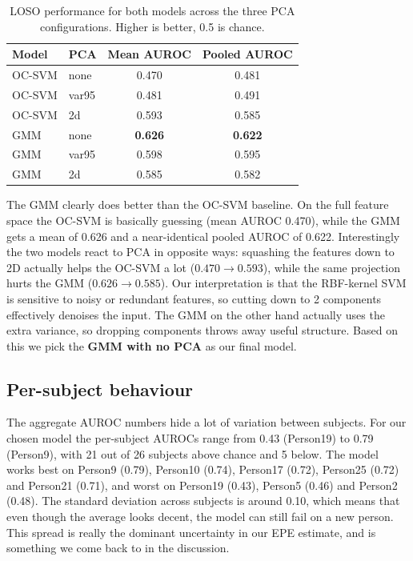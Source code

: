 \documentclass{article}
\begin{document}
\begin{table}[H]
    \centering
    \begin{tabular}{llcc}
        \toprule
        Model & PCA & Mean AUROC & Pooled AUROC \\
        \midrule
        OC-SVM & none  & 0.470 & 0.481 \\
        OC-SVM & var95 & 0.481 & 0.491 \\
        OC-SVM & 2d    & 0.593 & 0.585 \\
        GMM    & none  & \textbf{0.626} & \textbf{0.622} \\
        GMM    & var95 & 0.598 & 0.595 \\
        GMM    & 2d    & 0.585 & 0.582 \\
        \bottomrule
    \end{tabular}
    \caption{LOSO performance for both models across the three PCA configurations. Higher is better, 0.5 is chance.}
    \label{tab:auroc}
\end{table}

The GMM clearly does better than the OC-SVM baseline. On the full feature space the OC-SVM is basically guessing (mean AUROC 0.470), while the GMM gets a mean of 0.626 and a near-identical pooled AUROC of 0.622. Interestingly the two models react to PCA in opposite ways: squashing the features down to 2D actually helps the OC-SVM a lot ($0.470 \rightarrow 0.593$), while the same projection hurts the GMM ($0.626 \rightarrow 0.585$). Our interpretation is that the RBF-kernel SVM is sensitive to noisy or redundant features, so cutting down to 2 components effectively denoises the input. The GMM on the other hand actually uses the extra variance, so dropping components throws away useful structure. Based on this we pick the \textbf{GMM with no PCA} as our final model.

\subsection*{Per-subject behaviour}
The aggregate AUROC numbers hide a lot of variation between subjects. For our chosen model the per-subject AUROCs range from 0.43 (Person19) to 0.79 (Person9), with 21 out of 26 subjects above chance and 5 below. The model works best on Person9 (0.79), Person10 (0.74), Person17 (0.72), Person25 (0.72) and Person21 (0.71), and worst on Person19 (0.43), Person5 (0.46) and Person2 (0.48). The standard deviation across subjects is around 0.10, which means that even though the average looks decent, the model can still fail on a new person. This spread is really the dominant uncertainty in our EPE estimate, and is something we come back to in the discussion.
\end{document}
